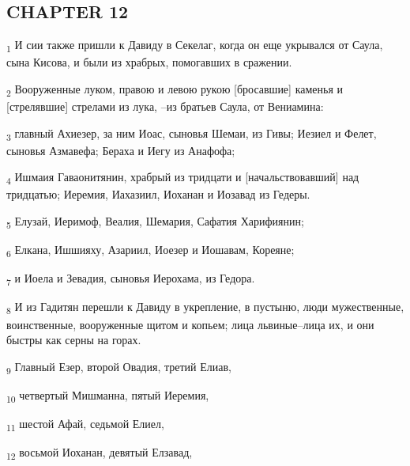 \subsection{CHAPTER 12}
\begin{tcolorbox}
\textsubscript{1} И сии также пришли к Давиду в Секелаг, когда он еще укрывался от Саула, сына Кисова, и были из храбрых, помогавших в сражении.
\end{tcolorbox}
\begin{tcolorbox}
\textsubscript{2} Вооруженные луком, правою и левою рукою [бросавшие] каменья и [стрелявшие] стрелами из лука, --из братьев Саула, от Вениамина:
\end{tcolorbox}
\begin{tcolorbox}
\textsubscript{3} главный Ахиезер, за ним Иоас, сыновья Шемаи, из Гивы; Иезиел и Фелет, сыновья Азмавефа; Бераха и Иегу из Анафофа;
\end{tcolorbox}
\begin{tcolorbox}
\textsubscript{4} Ишмаия Гаваонитянин, храбрый из тридцати и [начальствовавший] над тридцатью; Иеремия, Иахазиил, Иоханан и Иозавад из Гедеры.
\end{tcolorbox}
\begin{tcolorbox}
\textsubscript{5} Елузай, Иеримоф, Веалия, Шемария, Сафатия Харифиянин;
\end{tcolorbox}
\begin{tcolorbox}
\textsubscript{6} Елкана, Ишшияху, Азариил, Иоезер и Иошавам, Кореяне;
\end{tcolorbox}
\begin{tcolorbox}
\textsubscript{7} и Иоела и Зевадия, сыновья Иерохама, из Гедора.
\end{tcolorbox}
\begin{tcolorbox}
\textsubscript{8} И из Гадитян перешли к Давиду в укрепление, в пустыню, люди мужественные, воинственные, вооруженные щитом и копьем; лица львиные--лица их, и они быстры как серны на горах.
\end{tcolorbox}
\begin{tcolorbox}
\textsubscript{9} Главный Езер, второй Овадия, третий Елиав,
\end{tcolorbox}
\begin{tcolorbox}
\textsubscript{10} четвертый Мишманна, пятый Иеремия,
\end{tcolorbox}
\begin{tcolorbox}
\textsubscript{11} шестой Афай, седьмой Елиел,
\end{tcolorbox}
\begin{tcolorbox}
\textsubscript{12} восьмой Иоханан, девятый Елзавад,
\end{tcolorbox}
